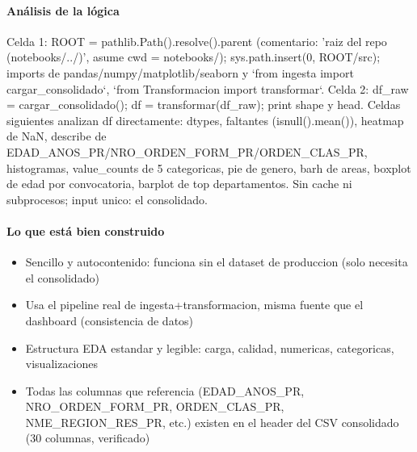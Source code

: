 \paragraph{Análisis de la lógica}
Celda 1: ROOT = pathlib.Path().resolve().parent (comentario: 'raiz del repo (notebooks/../)', asume cwd = notebooks/); sys.path.insert(0, ROOT/src); imports de pandas/numpy/matplotlib/seaborn y `from ingesta import cargar\_consolidado`, `from Transformacion import transformar`. Celda 2: df\_raw = cargar\_consolidado(); df = transformar(df\_raw); print shape y head. Celdas siguientes analizan df directamente: dtypes, faltantes (isnull().mean()), heatmap de NaN, describe de EDAD\_ANOS\_PR/NRO\_ORDEN\_FORM\_PR/ORDEN\_CLAS\_PR, histogramas, value\_counts de 5 categoricas, pie de genero, barh de areas, boxplot de edad por convocatoria, barplot de top departamentos. Sin cache ni subprocesos; input unico: el consolidado.

\paragraph{Lo que está bien construido}
\begin{itemize}
  \item Sencillo y autocontenido: funciona sin el dataset de produccion (solo necesita el consolidado)
  \item Usa el pipeline real de ingesta+transformacion, misma fuente que el dashboard (consistencia de datos)
  \item Estructura EDA estandar y legible: carga, calidad, numericas, categoricas, visualizaciones
  \item Todas las columnas que referencia (EDAD\_ANOS\_PR, NRO\_ORDEN\_FORM\_PR, ORDEN\_CLAS\_PR, NME\_REGION\_RES\_PR, etc.) existen en el header del CSV consolidado (30 columnas, verificado)
\end{itemize}

